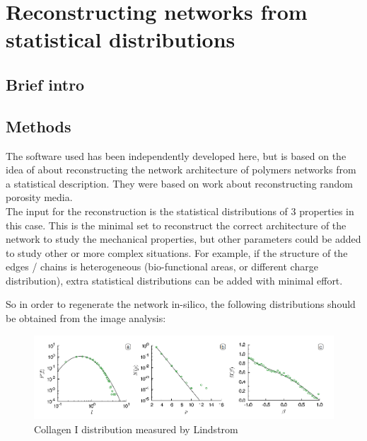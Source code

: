 
\chapter{Reconstructing networks from statistical distributions} %

\label{Chapter-Reconstruction} %


\section{Brief intro}

\section{Methods}

The  software used has been independently developed here, but is based on the
idea of \citet{lindstrom_biopolymer_2010} about reconstructing the network
architecture of polymers networks from a statistical description. They were
based on \citet{yeong_reconstructing_1998,yeong_reconstructing_1998-1} work
about  reconstructing random porosity media.\\
The input for the reconstruction is the
statistical distributions of $3$ properties in this case. This is the minimal 
set to reconstruct the correct architecture of the network to study the
mechanical properties, but other parameters could be added to study other or
more complex situations.  For example, if the structure of the edges / chains is
heterogeneous  (bio-functional areas, or different charge distribution), extra
statistical distributions can be added with minimal effort.

So in order to regenerate the network in-silico, the following distributions
should be obtained from the image analysis:
\begin{figure}[h!]
\begin{center}
\includegraphics[width=1.0\textwidth]{Figures/chapter-reconstruct/lindstrom-paper-images.png}

\caption[Collagen distributions]{Collagen I distribution measured by Lindstrom
\citep{lindstrom_biopolymer_2010}}

\end{center}
\end{figure}

